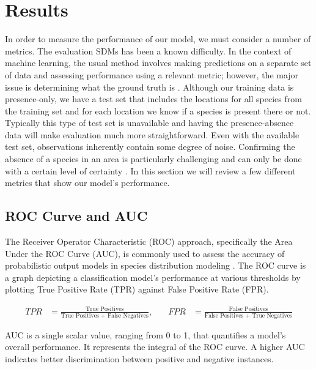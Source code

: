 \documentclass{article}
\begin{document}
\section{Results}

In order to measure the performance of our model, we must consider a number of metrics. The evaluation SDMs has been a known difficulty. In the context of machine learning, the usual method involves making predictions on a separate set of data and assessing performance using a relevant metric; however, the major issue is determining what the ground truth is \cite{review}. Although our training data is presence-only, we have a test set that includes the locations for all species from the training set and for each location we know if a species is present there or not. Typically this type of test set is unavailable and having the presence-absence data will make evaluation much more straightforward. Even with the available test set, observations inherently contain some degree of noise. Confirming the absence of a species in an area is particularly challenging and can only be done with a certain level of certainty \cite{review}. In this section we will review a few different metrics that show our model's performance.  

\subsection{ROC Curve and AUC}
The Receiver Operator Characteristic (ROC) approach, specifically the Area Under the ROC Curve (AUC), is commonly used to assess the accuracy of probabilistic output models in species distribution modeling \cite{moutonEcologicalRelevancePerformance2010, rareplants, maxent}. The ROC curve is a graph depicting a classification model's performance at various thresholds by plotting True Positive Rate (TPR) against False Positive Rate (FPR). 

\begin{equation*}
\begin{aligned}
TPR & = \frac{\text{True Positives}}{\text{True Positives + False Negatives}}, & \quad
FPR & = \frac{\text{False Positives}}{\text{False Positives + True Negatives}}
\end{aligned}
\end{equation*}


AUC is a single scalar value, ranging from 0 to 1, that quantifies a model's overall performance. It represents the integral of the ROC curve. A higher AUC indicates better discrimination between positive and negative instances.
\end{document}
